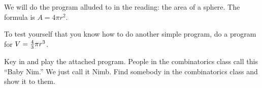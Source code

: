 \bigskip

\nobreak\bigskip

\noindent We will do the program alluded to in the reading: the area of a sphere. The formula is $A = 4 \pi r^2$.
\bigskip

\nobreak\bigskip

\noindent To test yourself that you know how to do another simple program, do a program for $V = {4\over 3} \pi r^3$.

\bigskip

\nobreak\bigskip

\noindent Key in and play the attached program. People in the combinatorics class call this ``Baby Nim.'' We just call it Nimb. Find somebody in the combinatorics class and show it to them.

\bye
